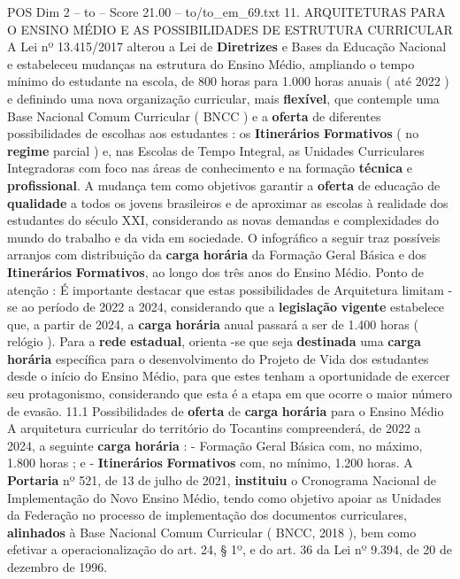\begin{textsample}{POS Dim 2 – to – Score 21.00 – to/to\_em\_69.txt}  \label{ex:f2_pos_140}
11.
ARQUITETURAS PARA O ENSINO MÉDIO E AS POSSIBILIDADES DE ESTRUTURA CURRICULAR A Lei nº 13.415/2017 alterou a Lei de \textbf{Diretrizes} e Bases da Educação Nacional e estabeleceu mudanças na estrutura do Ensino Médio, ampliando o tempo mínimo do estudante na escola, de 800 horas para 1.000 horas anuais ( até 2022 ) e definindo uma nova organização curricular, mais \textbf{flexível}, que contemple uma Base Nacional Comum Curricular ( BNCC ) e a \textbf{oferta} de diferentes possibilidades de escolhas aos estudantes : os \textbf{Itinerários} \textbf{Formativos} ( no \textbf{regime} parcial ) e, nas Escolas de Tempo Integral, as Unidades Curriculares Integradoras com foco nas áreas de conhecimento e na formação \textbf{técnica} e \textbf{profissional}.
A mudança tem como objetivos garantir a \textbf{oferta} de educação de \textbf{qualidade} a todos os jovens brasileiros e de aproximar as escolas à realidade dos estudantes do século XXI, considerando as novas demandas e complexidades do mundo do trabalho e da vida em sociedade.
O infográfico a seguir traz possíveis arranjos com distribuição da \textbf{carga} \textbf{horária} da Formação Geral Básica e dos \textbf{Itinerários} \textbf{Formativos}, ao longo dos três anos do Ensino Médio.
Ponto de atenção : É importante destacar que estas possibilidades de Arquitetura limitam -se ao período de 2022 a 2024, considerando que a \textbf{legislação} \textbf{vigente} estabelece que, a partir de 2024, a \textbf{carga} \textbf{horária} anual passará a ser de 1.400 horas ( relógio ).
Para a \textbf{rede} \textbf{estadual}, orienta -se que seja \textbf{destinada} uma \textbf{carga} \textbf{horária} específica para o desenvolvimento do Projeto de Vida dos estudantes desde o início do Ensino Médio, para que estes tenham a oportunidade de exercer seu protagonismo, considerando que esta é a etapa em que ocorre o maior número de evasão. 11.1 Possibilidades de \textbf{oferta} de \textbf{carga} \textbf{horária} para o Ensino Médio A arquitetura curricular do território do Tocantins compreenderá, de 2022 a 2024, a seguinte \textbf{carga} \textbf{horária} : - Formação Geral Básica com, no máximo, 1.800 horas ; e - \textbf{Itinerários} \textbf{Formativos} com, no mínimo, 1.200 horas.
A \textbf{Portaria} nº 521, de 13 de julho de 2021, \textbf{instituiu} o Cronograma Nacional de Implementação do Novo Ensino Médio, tendo como objetivo apoiar as Unidades da Federação no processo de implementação dos documentos curriculares, \textbf{alinhados} à Base Nacional Comum Curricular ( BNCC, 2018 ), bem como efetivar a operacionalização do art. 24, § 1º, e do art. 36 da Lei nº 9.394, de 20 de dezembro de 1996.

\end{textsample}
